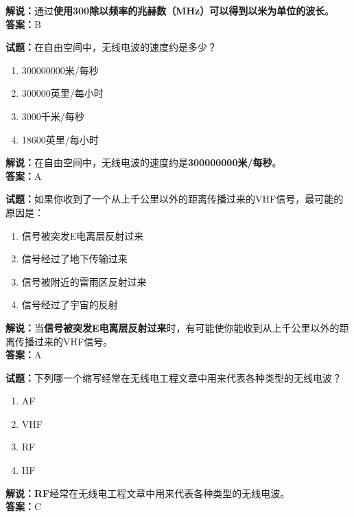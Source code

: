 \documentclass{ctexbook}
\begin{document}
\noindent\textbf{解说：}通过\textbf{使用300除以频率的兆赫数（\si{\MHz}）可以得到以米为单位的波长}。\\\noindent\textbf{答案：}B

\bigskip

\noindent\textbf{试题：}在自由空间中，无线电波的速度约是多少？

\begin{enumerate}[leftmargin=3em]
  \item 300000000米/每秒
  \item 300000英里/每小时
  \item 3000千米/每秒
  \item 18600英里/每小时
\end{enumerate}

\noindent\textbf{解说：}在自由空间中，无线电波的速度约是\textbf{300000000米/每秒}。\\\noindent\textbf{答案：}A

\bigskip

\noindent\textbf{试题：}如果你收到了一个从上千公里以外的距离传播过来的VHF信号，最可能的原因是：

\begin{enumerate}[leftmargin=3em]
  \item 信号被突发E电离层反射过来
  \item 信号经过了地下传输过来
  \item 信号被附近的雷雨区反射过来
  \item 信号经过了宇宙的反射
\end{enumerate}

\noindent\textbf{解说：}当\textbf{信号被突发E电离层反射过来}时，有可能使你能收到从上千公里以外的距离传播过来的VHF信号。\\\noindent\textbf{答案：}A

\bigskip

\noindent\textbf{试题：}下列哪一个缩写经常在无线电工程文章中用来代表各种类型的无线电波？

\begin{enumerate}[leftmargin=3em]
  \item AF
  \item VHF
  \item RF
  \item HF
\end{enumerate}

\noindent\textbf{解说：RF}经常在无线电工程文章中用来代表各种类型的无线电波。\\\noindent\textbf{答案：}C

\bigskip
\end{document}
